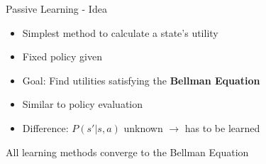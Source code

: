 \begin{frame}[c]{Passive Learning - Idea}
\begin{itemize}
		\item Simplest method to calculate a state's utility
		\item Fixed policy given
		\item Goal: Find utilities satisfying the \textbf{Bellman Equation}
		\item Similar to policy evaluation
		\item Difference: $P(s'|s,a)$ unknown $\rightarrow$ has to be learned
\end{itemize}
\vspace{1cm}
All learning methods converge to the Bellman Equation
\end{frame}

